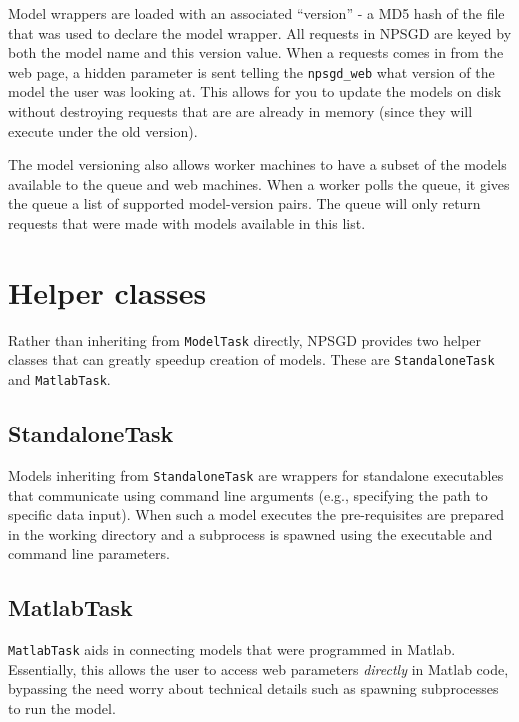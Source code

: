 \documentclass{article}
\newcommand{\mclass}[1]{\sloppy\texttt{#1}}
\begin{document}
Model wrappers are loaded with an associated ``version'' - a MD5 hash of the
file that was used to declare the model wrapper. All requests in NPSGD are keyed
by both the model name and this version value. When a requests comes in from the
web page, a hidden parameter is sent telling the \texttt{npsgd\_web} what
version of the model the user was looking at. This allows for you to update the
models on disk without destroying requests that are are already in memory (since
they will execute under the old version).

The model versioning also allows worker machines to have a subset of the models
available to the queue and web machines. When a worker polls the queue, it gives
the queue a list of supported model-version pairs. The queue will only return
requests that were made with models available in this list.

\section{Helper classes}
\label{sec:helpers}
Rather than inheriting from \mclass{ModelTask} directly, NPSGD provides two
helper classes that can greatly speedup creation of models. These are
\mclass{StandaloneTask} and \mclass{MatlabTask}.

\subsection{StandaloneTask}
Models inheriting from \mclass{StandaloneTask} are wrappers for standalone executables
that communicate using command line arguments (e.g., specifying the path to
specific data input). When such a model executes the pre-requisites are prepared
in the working directory and a subprocess is spawned using the executable and
command line parameters. 

\subsection{MatlabTask}
\mclass{MatlabTask} aids in connecting models that were programmed in Matlab. Essentially, this
allows the user to access web parameters \textit{directly} in Matlab code,
bypassing the need worry about technical details such as spawning subprocesses
to run the model.
\end{document}

